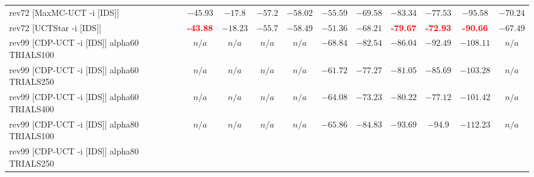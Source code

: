 \documentclass{article}
\begin{document}
\begin{tabular}{|l|r@{$\pm$}rr@{$\pm$}rr@{$\pm$}rr@{$\pm$}rr@{$\pm$}rr@{$\pm$}rr@{$\pm$}rr@{$\pm$}rr@{$\pm$}rr@{$\pm$}r|}
rev72 [MaxMC-UCT -i [IDS]]
& \multicolumn{2}{c}{$-45.93$}
& \multicolumn{2}{c}{$-17.8$}
& \multicolumn{2}{c}{$-57.2$}
& \multicolumn{2}{c}{$-58.02$}
& \multicolumn{2}{c}{$-55.59$}
& \multicolumn{2}{c}{$-69.58$}
& \multicolumn{2}{c}{$-83.34$}
& \multicolumn{2}{c}{$-77.53$}
& \multicolumn{2}{c}{$-95.58$}
& \multicolumn{2}{c|}{$-70.24$}
\\
rev72 [UCTStar -i [IDS]]
& \multicolumn{2}{c}{\textbf{\textcolor{red}{-43.88}}}
& \multicolumn{2}{c}{$-18.23$}
& \multicolumn{2}{c}{$-55.7$}
& \multicolumn{2}{c}{$-58.49$}
& \multicolumn{2}{c}{$-51.36$}
& \multicolumn{2}{c}{$-68.21$}
& \multicolumn{2}{c}{\textbf{\textcolor{red}{-79.67}}}
& \multicolumn{2}{c}{\textbf{\textcolor{red}{-72.93}}}
& \multicolumn{2}{c}{\textbf{\textcolor{red}{-90.66}}}
& \multicolumn{2}{c|}{$-67.49$}
\\
\hline
rev99 [CDP-UCT -i [IDS]] alpha60 TRIALS100
& \multicolumn{2}{c}{\textbf{$n/a$}}
& \multicolumn{2}{c}{\textbf{$n/a$}}
& \multicolumn{2}{c}{\textbf{$n/a$}}
& \multicolumn{2}{c}{\textbf{$n/a$}}
& \multicolumn{2}{c}{$-68.84$}
& \multicolumn{2}{c}{$-82.54$}
& \multicolumn{2}{c}{$-86.04$}
& \multicolumn{2}{c}{$-92.49$}
& \multicolumn{2}{c}{$-108.11$}
& \multicolumn{2}{c|}{\textbf{$n/a$}}
\\
rev99 [CDP-UCT -i [IDS]] alpha60 TRIALS250
& \multicolumn{2}{c}{\textbf{$n/a$}}
& \multicolumn{2}{c}{\textbf{$n/a$}}
& \multicolumn{2}{c}{\textbf{$n/a$}}
& \multicolumn{2}{c}{\textbf{$n/a$}}
& \multicolumn{2}{c}{$-61.72$}
& \multicolumn{2}{c}{$-77.27$}
& \multicolumn{2}{c}{\textbf{$-81.05$}}
& \multicolumn{2}{c}{$-85.69$}
& \multicolumn{2}{c}{$-103.28$}
& \multicolumn{2}{c|}{\textbf{$n/a$}}
\\
rev99 [CDP-UCT -i [IDS]] alpha60 TRIALS400
& \multicolumn{2}{c}{\textbf{$n/a$}}
& \multicolumn{2}{c}{\textbf{$n/a$}}
& \multicolumn{2}{c}{\textbf{$n/a$}}
& \multicolumn{2}{c}{\textbf{$n/a$}}
& \multicolumn{2}{c}{$-64.08$}
& \multicolumn{2}{c}{$-73.23$}
& \multicolumn{2}{c}{\textbf{$-80.22$}}
& \multicolumn{2}{c}{$-77.12$}
& \multicolumn{2}{c}{$-101.42$}
& \multicolumn{2}{c|}{\textbf{$n/a$}}
\\
rev99 [CDP-UCT -i [IDS]] alpha80 TRIALS100
& \multicolumn{2}{c}{\textbf{$n/a$}}
& \multicolumn{2}{c}{\textbf{$n/a$}}
& \multicolumn{2}{c}{\textbf{$n/a$}}
& \multicolumn{2}{c}{\textbf{$n/a$}}
& \multicolumn{2}{c}{$-65.86$}
& \multicolumn{2}{c}{$-84.83$}
& \multicolumn{2}{c}{$-93.69$}
& \multicolumn{2}{c}{$-94.9$}
& \multicolumn{2}{c}{$-112.23$}
& \multicolumn{2}{c|}{\textbf{$n/a$}}
\\
rev99 [CDP-UCT -i [IDS]] alpha80 TRIALS250

\end{tabular}
\end{document}
